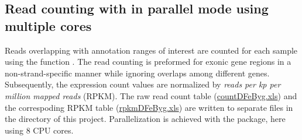 \documentclass{article}\usepackage[]{graphicx}\usepackage[]{color}
\begin{document}
\subsection{Read counting with  in parallel mode using multiple cores}
Reads overlapping with annotation ranges of interest are counted for each sample using the  function \citep{Lawrence2013-kt}. The read counting is preformed for exonic gene regions in a non-strand-specific manner while ignoring overlaps among different genes. Subsequently, the expression count values are normalized by \textit{reads per kp per million mapped reads} (RPKM). The raw read count table (\href{run:./results/countDFeByg.xls}{countDFeByg.xls}) and the correspoding RPKM table (\href{run:./results/rpkmDFeByg.xls}{rpkmDFeByg.xls}) are written to separate files in the  directory of this project. Parallelization is achieved with the  package, here using 8 CPU cores.
\end{document}
